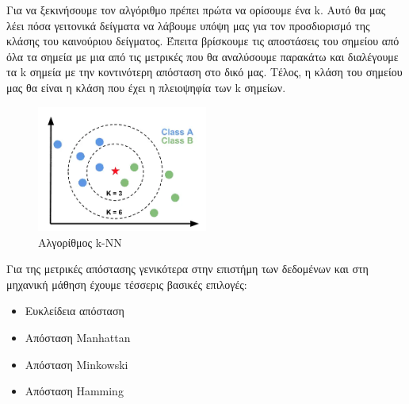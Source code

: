 Για να ξεκινήσουμε τον αλγόριθμο πρέπει πρώτα να ορίσουμε ένα \textlatin{k}. Αυτό θα μας λέει
πόσα γειτονικά δείγματα να λάβουμε υπόψη μας για τον προσδιορισμό της κλάσης του καινούριου
δείγματος. Έπειτα βρίσκουμε τις αποστάσεις του σημείου από όλα τα σημεία με μια από τις μετρικές
που θα αναλύσουμε παρακάτω και διαλέγουμε τα \textlatin{k} σημεία με την κοντινότερη απόσταση στο
δικό μας. Τέλος, η κλάση του σημείου μας θα είναι η κλάση που έχει η πλειοψηφία των \textlatin{k}
σημείων.
\begin{figure}[H]
    \centering
    \includegraphics[width=0.5\textwidth]{images/knearest.png}
    \caption{Αλγορίθμος \textlatin{k-NN}}
\end{figure}

Για της μετρικές απόστασης γενικότερα στην επιστήμη των δεδομένων και στη μηχανική μάθηση έχουμε
τέσσερις βασικές επιλογές:
\begin{itemize}
    \item Ευκλείδεια απόσταση
    \item Απόσταση \textlatin{Manhattan}
    \item Απόσταση \textlatin{Minkowski}
    \item Απόσταση \textlatin{Hamming}
\end{itemize}

